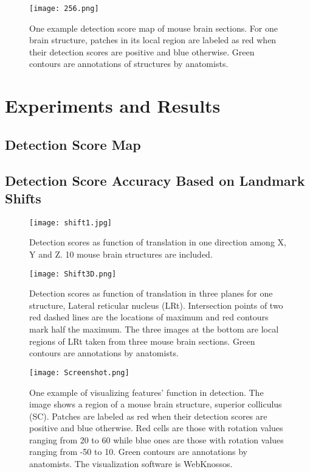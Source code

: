 \documentclass[runningheads]{llncs}
\begin{document}
\begin{figure}
\texttt{[image: 256.png]}
\caption{One example detection score map of mouse brain sections. For one brain structure, patches in its local region are labeled as red when their detection scores are positive and blue otherwise. Green contours are annotations of structures by anatomists.}
\label{scoremap}
\end{figure}

\section{Experiments and Results}


\subsection{Detection Score Map}

\subsection{Detection Score Accuracy Based on Landmark Shifts}



\begin{figure}
\texttt{[image: shift1.jpg]}
\caption{Detection scores as function of translation in one direction among X, Y and Z. 10 mouse brain structures are included.}
\label{1Dshift}
\end{figure}


\begin{figure}
\texttt{[image: Shift3D.png]}
\caption{Detection scores as function of translation in three planes for one structure, Lateral reticular nucleus (LRt). Intersection points of two red dashed lines are the locations of maximum and red contours mark half the maximum. The three images at the bottom are local regions of LRt taken from three mouse brain sections. Green contours are annotations by anatomists.}
\label{3Dshift}
\end{figure}


\begin{figure}
\texttt{[image: Screenshot.png]}
\caption{One example of visualizing features' function in detection. The image shows a region of a mouse brain structure, superior colliculus (SC). Patches are labeled as red when their detection scores are positive and blue otherwise. Red cells are those with rotation values ranging from 20 to 60 while blue ones are those with rotation values ranging from -50 to 10. Green contours are annotations by anatomists. The visualization software is WebKnossos.}
\label{webknossos}
\end{figure}
\end{document}
